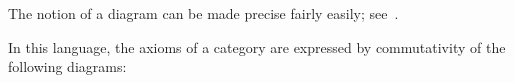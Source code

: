\noindent
The notion of a diagram can be made precise fairly easily; see~\cite[Section 1.6]{riehl-2017}.

\begin{ex}
In this language, the axioms of a category are expressed by commutativity of the
following diagrams:
\begin{figure}[H]
  \centering
\end{figure}
\end{ex}
